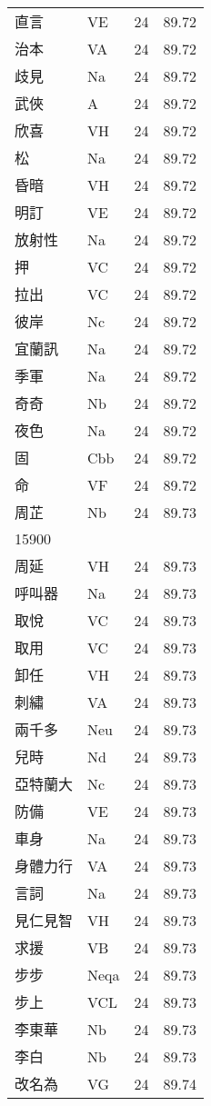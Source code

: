 \documentclass[twocolumn]{book}
\begin{document}
\begin{supertabular}{llrr}
直言 & VE & 24 &  89.72\\
治本 & VA & 24 &  89.72\\
歧見 & Na & 24 &  89.72\\
武俠 & A & 24 &  89.72\\
欣喜 & VH & 24 &  89.72\\
松 & Na & 24 &  89.72\\
昏暗 & VH & 24 &  89.72\\
明訂 & VE & 24 &  89.72\\
放射性 & Na & 24 &  89.72\\
押 & VC & 24 &  89.72\\
拉出 & VC & 24 &  89.72\\
彼岸 & Nc & 24 &  89.72\\
宜蘭訊 & Na & 24 &  89.72\\
季軍 & Na & 24 &  89.72\\
奇奇 & Nb & 24 &  89.72\\
夜色 & Na & 24 &  89.72\\
固 & Cbb & 24 &  89.72\\
命 & VF & 24 &  89.72\\
周芷 & Nb & 24 &  89.73\\
15900\\
周延 & VH & 24 &  89.73\\
呼叫器 & Na & 24 &  89.73\\
取悅 & VC & 24 &  89.73\\
取用 & VC & 24 &  89.73\\
卸任 & VH & 24 &  89.73\\
刺繡 & VA & 24 &  89.73\\
兩千多 & Neu & 24 &  89.73\\
兒時 & Nd & 24 &  89.73\\
亞特蘭大 & Nc & 24 &  89.73\\
防備 & VE & 24 &  89.73\\
車身 & Na & 24 &  89.73\\
身體力行 & VA & 24 &  89.73\\
言詞 & Na & 24 &  89.73\\
見仁見智 & VH & 24 &  89.73\\
求援 & VB & 24 &  89.73\\
步步 & Neqa & 24 &  89.73\\
步上 & VCL & 24 &  89.73\\
李東華 & Nb & 24 &  89.73\\
李白 & Nb & 24 &  89.73\\
改名為 & VG & 24 &  89.74\\

\end{supertabular}
\end{document}
